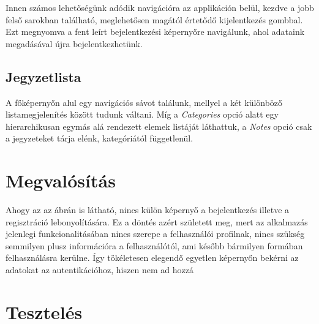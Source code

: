 Innen számos lehetőségünk adódik navigációra az applikáción belül, kezdve a jobb felső sarokban található, meglehetősen magától értetődő kijelentkezés gombbal. Ezt megnyomva a fent leírt bejelentkezési képernyőre navigálunk, ahol adataink megadásával újra bejelentkezhetünk.

\subsection{Jegyzetlista}
A főképernyőn alul egy navigációs sávot találunk, mellyel a két különböző listamegjelenítés között tudunk váltani. Míg a \emph{Categories} opció alatt egy hierarchikusan egymás alá rendezett elemek listáját láthattuk, a \emph{Notes} opció csak a jegyzeteket tárja elénk, kategóriától függetlenül.  
\section{Megvalósítás}

Ahogy az az ábrán is látható, nincs külön képernyő a bejelentkezés illetve a regisztráció lebonyolítására. Ez a döntés azért született meg, mert az alkalmazás jelenlegi funkcionalitásában nincs szerepe a felhasználói profilnak, nincs szükség semmilyen plusz információra a felhasználótól, ami később bármilyen formában felhasználásra kerülne. Így tökéletesen elegendő egyetlen képernyőn bekérni az adatokat az autentikációhoz, hiszen nem ad hozzá 

\section{Tesztelés}